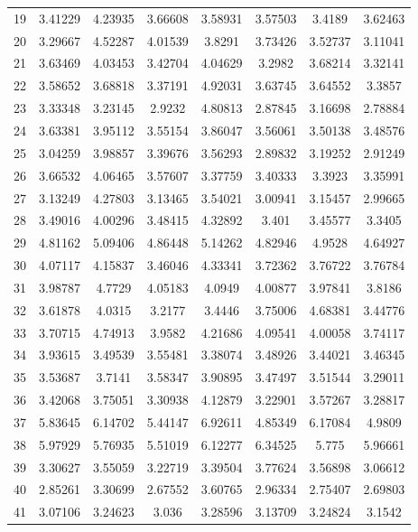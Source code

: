 \begin{center}
\begin{longtable}{cccccccc}
19 & 3.41229 & 4.23935 & 3.66608 & 3.58931 & 3.57503 & 3.4189 & 3.62463\\
20 & 3.29667 & 4.52287 & 4.01539 & 3.8291 & 3.73426 & 3.52737 & 3.11041\\
21 & 3.63469 & 4.03453 & 3.42704 & 4.04629 & 3.2982 & 3.68214 & 3.32141\\
22 & 3.58652 & 3.68818 & 3.37191 & 4.92031 & 3.63745 & 3.64552 & 3.3857\\
23 & 3.33348 & 3.23145 & 2.9232 & 4.80813 & 2.87845 & 3.16698 & 2.78884\\
24 & 3.63381 & 3.95112 & 3.55154 & 3.86047 & 3.56061 & 3.50138 & 3.48576\\
25 & 3.04259 & 3.98857 & 3.39676 & 3.56293 & 2.89832 & 3.19252 & 2.91249\\
26 & 3.66532 & 4.06465 & 3.57607 & 3.37759 & 3.40333 & 3.3923 & 3.35991\\
27 & 3.13249 & 4.27803 & 3.13465 & 3.54021 & 3.00941 & 3.15457 & 2.99665\\
28 & 3.49016 & 4.00296 & 3.48415 & 4.32892 & 3.401 & 3.45577 & 3.3405\\
29 & 4.81162 & 5.09406 & 4.86448 & 5.14262 & 4.82946 & 4.9528 & 4.64927\\
30 & 4.07117 & 4.15837 & 3.46046 & 4.33341 & 3.72362 & 3.76722 & 3.76784\\
31 & 3.98787 & 4.7729 & 4.05183 & 4.0949 & 4.00877 & 3.97841 & 3.8186\\
32 & 3.61878 & 4.0315 & 3.2177 & 3.4446 & 3.75006 & 4.68381 & 3.44776\\
33 & 3.70715 & 4.74913 & 3.9582 & 4.21686 & 4.09541 & 4.00058 & 3.74117\\
34 & 3.93615 & 3.49539 & 3.55481 & 3.38074 & 3.48926 & 3.44021 & 3.46345\\
35 & 3.53687 & 3.7141 & 3.58347 & 3.90895 & 3.47497 & 3.51544 & 3.29011\\
36 & 3.42068 & 3.75051 & 3.30938 & 4.12879 & 3.22901 & 3.57267 & 3.28817\\
37 & 5.83645 & 6.14702 & 5.44147 & 6.92611 & 4.85349 & 6.17084 & 4.9809\\
38 & 5.97929 & 5.76935 & 5.51019 & 6.12277 & 6.34525 & 5.775 & 5.96661\\
39 & 3.30627 & 3.55059 & 3.22719 & 3.39504 & 3.77624 & 3.56898 & 3.06612\\
40 & 2.85261 & 3.30699 & 2.67552 & 3.60765 & 2.96334 & 2.75407 & 2.69803\\
41 & 3.07106 & 3.24623 & 3.036 & 3.28596 & 3.13709 & 3.24824 & 3.1542\\

\end{longtable}
\end{center}
